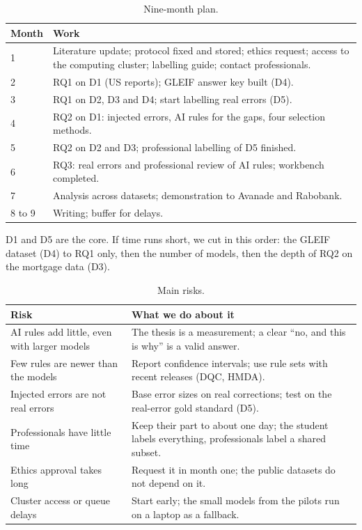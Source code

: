 \documentclass[11pt,a4paper]{article}
\begin{document}
\begin{table}[htbp]
\centering
\small
\begin{tabularx}{\textwidth}{@{}p{1.4cm}L@{}}
\toprule
Month & Work \\
 & Literature update; protocol fixed and stored; ethics request; access to the computing cluster; labelling guide; contact professionals. \\
2 & RQ1 on D1 (US reports); GLEIF answer key built (D4). \\
3 & RQ1 on D2, D3 and D4; start labelling real errors (D5). \\
4 & RQ2 on D1: injected errors, AI rules for the gaps, four selection methods. \\
5 & RQ2 on D2 and D3; professional labelling of D5 finished. \\
6 & RQ3: real errors and professional review of AI rules; workbench completed. \\
7 & Analysis across datasets; demonstration to Avanade and Rabobank. \\
8 to 9 & Writing; buffer for delays. \\
\bottomrule
\end{tabularx}
\caption{Nine-month plan.}
\label{tab:plan}
\end{table}

D1 and D5 are the core. If time runs short, we cut in this order: the GLEIF dataset (D4) to RQ1 only, then the number of models, then the depth of RQ2 on the mortgage data (D3).

\begin{table}[htbp]
\centering
\small
\begin{tabularx}{\textwidth}{@{}LL@{}}
\toprule
Risk & What we do about it \\
\midrule
AI rules add little, even with larger models & The thesis is a measurement; a clear ``no, and this is why'' is a valid answer. \\
Few rules are newer than the models & Report confidence intervals; use rule sets with recent releases (DQC, HMDA). \\
Injected errors are not real errors & Base error sizes on real corrections; test on the real-error gold standard (D5). \\
Professionals have little time & Keep their part to about one day; the student labels everything, professionals label a shared subset. \\
Ethics approval takes long & Request it in month one; the public datasets do not depend on it. \\
Cluster access or queue delays & Start early; the small models from the pilots run on a laptop as a fallback. \\
\bottomrule
\end{tabularx}
\caption{Main risks.}
\label{tab:risks}
\end{table}
\end{document}
